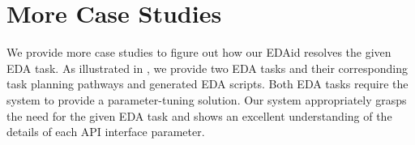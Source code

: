\section{More Case Studies}
\label{sec:appendix3}
We provide more case studies to figure out how our EDAid resolves the given EDA task.
As illustrated in , we provide two EDA tasks and their corresponding task planning pathways and generated EDA scripts.
Both EDA tasks require the system to provide a parameter-tuning solution.
Our system appropriately grasps the need for the given EDA task and shows an excellent understanding of the details of each API interface parameter.